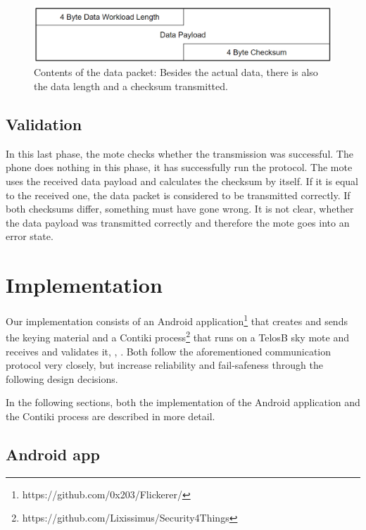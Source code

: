 \documentclass{sig-alternate} %
\begin{document}
\begin{figure}
	\centering
	\includegraphics[scale=.3]{images/data_packet.png}
	\caption{Contents of the data packet: Besides the actual data, there is also the data length and a checksum transmitted.}
	\label{fig:data_packet}
\end{figure}

\subsection{Validation}
\label{sub:validation}

In this last phase, the mote checks whether the transmission was successful.
The phone does nothing in this phase, it has successfully run the protocol.
The mote uses the received data payload and calculates the checksum by itself.
If it is equal to the received one, the data packet is considered to be transmitted correctly.
If both checksums differ, something must have gone wrong.
It is not clear, whether the data payload was transmitted correctly and therefore the mote goes into an error state.

\section{Implementation}
\label{sec:implementation}

Our implementation consists of an Android application\footnote{https://github.com/0x203/Flickerer/} that creates and sends the keying material and a Contiki process\footnote{https://github.com/Lixissimus/Security4Things} that runs on a TelosB sky mote and receives and validates it, \cite{dunkels04contiki}, \cite{telosb}.
Both follow the aforementioned communication protocol very closely, but increase reliability and fail-safeness through the following design decisions.


In the following sections, both the implementation of the Android application and the Contiki process are described in more detail.

\subsection{Android app}
\label{sub:android_app}
\end{document}
